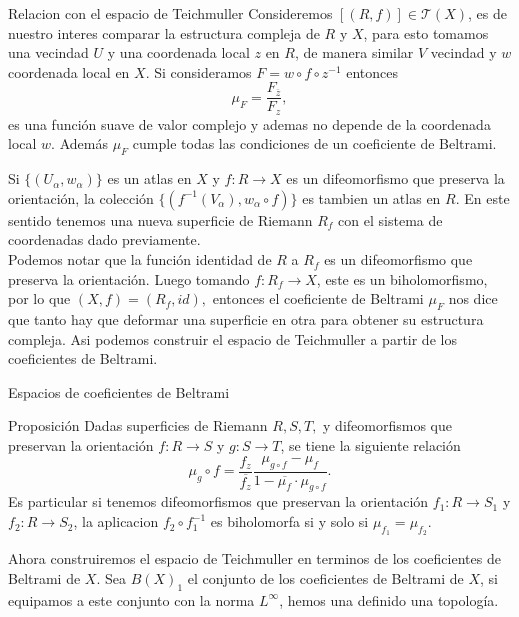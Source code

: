 \documentclass[xcolor=dvipsnames,10pt]{beamer}
\begin{document}
\begin{frame}{Relacion con el espacio de Teichmuller}
    Consideremos $[(R,f)]\in\mathcal{T}(X)$, es de nuestro interes comparar la estructura compleja de $R$ y $X$, para esto tomamos una vecindad $U$ y una coordenada local $z$ en $R$, de manera similar $V$ vecindad y $w$ coordenada local en $X.$ Si consideramos $F=w\circ f\circ z^{-1}$ entonces 
    $$\mu_F=\frac{F_{\overline{z}}}{F_z},$$
    es una función suave de valor complejo y ademas no depende de la coordenada local $w.$ Además $\mu_F$ cumple todas las condiciones de un coeficiente de Beltrami.
\end{frame}
\begin{frame}
    Si $\{(U_\alpha,w_\alpha)\}$ es un atlas en $X$ y $f:R\rightarrow X$ es un difeomorfismo que preserva la orientación, la colección $\{(f^{-1}(V_\alpha),w_\alpha \circ f)\}$ es tambien un atlas en $R$. En este sentido tenemos una nueva superficie de Riemann $R_f$ con el sistema de coordenadas dado previamente.\\
    \vspace{0.3cm}
    Podemos notar que la función identidad de $R$ a $R_f$ es un difeomorfismo que preserva la orientación. Luego tomando $f:R_f\to X$, este es un biholomorfismo, por lo que $(X,f)=(R_f,id),$ entonces el coeficiente de Beltrami $\mu_F$ nos dice que tanto hay que deformar una superficie en otra para obtener su estructura compleja. Asi podemos construir el espacio de Teichmuller a partir de los coeficientes de Beltrami.
\end{frame}
\begin{frame}{Espacios de coeficientes de Beltrami}

    \begin{block}{Proposición}
        Dadas superficies de Riemann $R,S,T,$ y difeomorfismos que preservan la orientación $f:R\to S$ y $g:S\to T$, se tiene la siguiente relación
        $$\mu_g\circ f=\frac{f_z}{\overline{f_z}}\frac{\mu_{g\circ f}-\mu_f}{1-\overline{\mu_f}\cdot\mu_{g\circ f}}.$$ 
        Es particular si tenemos difeomorfismos que preservan la orientación $f_1:R\to S_1$ y $f_2:R\to S_2$, la aplicacion $f_2\circ f_1^{-1}$ es biholomorfa si y solo si $\mu_{f_1}=\mu_{f_2}.$
    \end{block}
    Ahora construiremos el espacio de Teichmuller en terminos de los coeficientes de Beltrami de $X.$ Sea $B(X)_1$ el conjunto de los coeficientes de Beltrami de $X$, si equipamos a este conjunto con la norma $L^\infty$, hemos una definido una topología. 
\end{frame}
\end{document}
